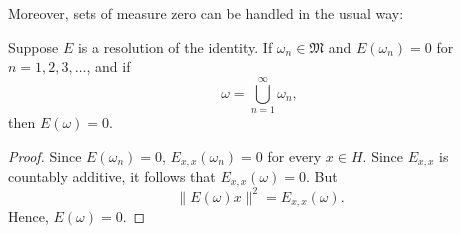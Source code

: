 Moreover, sets of measure zero can be handled in the usual way:

\begin{proposition}[12.19]
  Suppose \( E \) is a resolution of the identity.
  If \( \omega_n \in \mathfrak{M} \) and \( E(\omega_n) = 0 \) for \( n = 1,2,3,\dots \), and if
  \[
    \omega = \bigcup_{n=1}^{\infty} \omega_n,
  \]
  then \( E(\omega) = 0 \).
\end{proposition}

\begin{proof}
  Since \( E(\omega_n) = 0 \), \( E_{x,x}(\omega_n) = 0 \) for every \( x \in H \). Since \( E_{x,x} \) is countably additive, it follows that \( E_{x,x}(\omega) = 0 \). But
  \[
    \|E(\omega)x\|^2 = E_{x,x}(\omega).
  \]
  Hence, \( E(\omega) = 0 \).
\end{proof}









